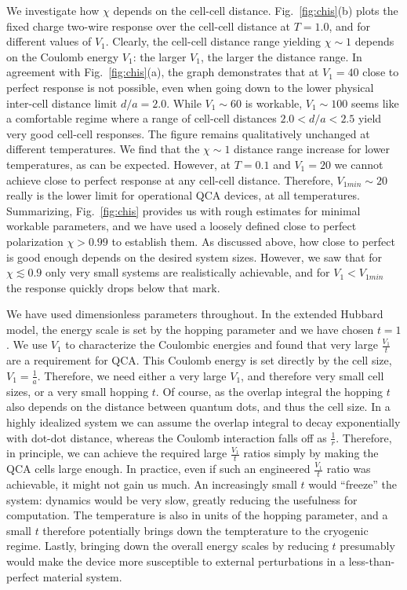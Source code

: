 We investigate how $\chi$ depends on the cell-cell distance.
Fig.~\ref{fig:chis}(b) plots the fixed charge two-wire response over the
cell-cell distance at $T = 1.0$, and for different values of $V_1$. Clearly, the
cell-cell distance range yielding $\chi \sim 1$ depends on the Coulomb energy
$V_1$: the larger $V_1$, the larger the distance range. In agreement with
Fig.~\ref{fig:chis}(a), the graph demonstrates that at $V_1 = 40$ close to
perfect response is not possible, even when going down to the lower physical
inter-cell distance limit $d/a = 2.0$. While $V_1 \sim 60$ is workable, $V_1
\sim 100$ seems like a comfortable regime where a range of cell-cell distances
$2.0 < d/a <2.5$ yield very good cell-cell responses. The figure remains
qualitatively unchanged at different temperatures. We find that the $\chi \sim
1$ distance range increase for lower temperatures, as can be expected. However,
at $T = 0.1$ and $V_1 = 20$ we cannot achieve close to perfect response at any
cell-cell distance.  Therefore, $V_{1min} \sim 20$ really is the lower limit for
operational QCA devices, at all temperatures. Summarizing, Fig.~\ref{fig:chis}
provides us with rough estimates for minimal workable parameters, and we have
used a loosely defined close to perfect polarization $\chi > 0.99$ to establish
them. As discussed above, how close to perfect is good enough depends on the
desired system sizes. However, we saw that for $\chi \lesssim 0.9$ only very
small systems are realistically achievable, and for $V_1 < V_{1min}$ the
response quickly drops below that mark.

We have used dimensionless parameters throughout. In the extended Hubbard model,
the energy scale is set by the hopping parameter and we have chosen $t = 1$. We
use $V_1$ to characterize the Coulombic energies and found that very large
$\frac{V_1}{t}$ are a requirement for QCA. This Coulomb energy is set directly
by the cell size, $V_1 = \frac{1}{a}$. Therefore, we need either a very large
$V_1$, and therefore very small cell sizes, or a very small hopping $t$. Of
course, as the overlap integral the hopping $t$ also depends on the distance
between quantum dots, and thus the cell size. In a highly idealized system we
can assume the overlap integral to decay exponentially with dot-dot distance,
whereas the Coulomb interaction falls off as $\frac{1}{r}$. Therefore, in
principle, we can achieve the required large $\frac{V_1}{t}$ ratios simply by
making the QCA cells large enough. In practice, even if such an engineered
$\frac{V_1}{t}$ ratio was achievable, it might not gain us much. An increasingly
small $t$ would ``freeze'' the system: dynamics would be very slow, greatly
reducing the usefulness for computation. The temperature is also in units of the
hopping parameter, and a small $t$ therefore potentially brings down the
tempterature to the cryogenic regime. Lastly, bringing down the overall energy
scales by reducing $t$ presumably would make the device more susceptible to
external perturbations in a less-than-perfect material system.

